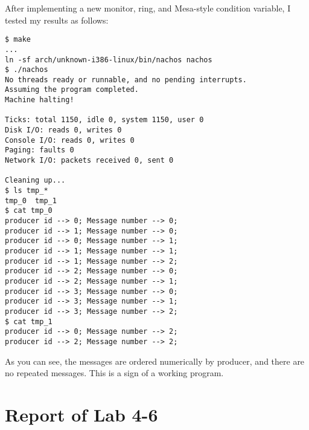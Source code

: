 \documentclass[11pt]{article}
\begin{document}
\begin{question}
    After implementing a new monitor, ring, and Mesa-style condition variable, I tested my results as follows:

    \begin{verbatim}
$ make
...
ln -sf arch/unknown-i386-linux/bin/nachos nachos
$ ./nachos
No threads ready or runnable, and no pending interrupts.
Assuming the program completed.
Machine halting!

Ticks: total 1150, idle 0, system 1150, user 0
Disk I/O: reads 0, writes 0
Console I/O: reads 0, writes 0
Paging: faults 0
Network I/O: packets received 0, sent 0

Cleaning up...
$ ls tmp_*
tmp_0  tmp_1
$ cat tmp_0
producer id --> 0; Message number --> 0;
producer id --> 1; Message number --> 0;
producer id --> 0; Message number --> 1;
producer id --> 1; Message number --> 1;
producer id --> 1; Message number --> 2;
producer id --> 2; Message number --> 0;
producer id --> 2; Message number --> 1;
producer id --> 3; Message number --> 0;
producer id --> 3; Message number --> 1;
producer id --> 3; Message number --> 2;
$ cat tmp_1
producer id --> 0; Message number --> 2;
producer id --> 2; Message number --> 2;
    \end{verbatim}

    As you can see, the messages are ordered numerically by producer, and there are no repeated messages. This is a sign of a working program.

\end{question}

\section{Report of Lab 4-6}
\end{document}
